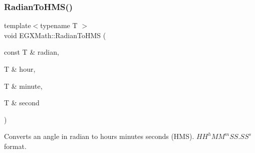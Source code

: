 \subsubsection{\texorpdfstring{Radian\+To\+H\+M\+S()}{RadianToHMS()}}
{\footnotesize\ttfamily template$<$typename T $>$ \\
void E\+G\+X\+Math\+::\+Radian\+To\+H\+MS (\begin{DoxyParamCaption}\item[{const T \&}]{radian,  }\item[{T \&}]{hour,  }\item[{T \&}]{minute,  }\item[{T \&}]{second }\end{DoxyParamCaption})}



Converts an angle in radian to hours minutes seconds (H\+MS). ${HH}^h{MM}^m{SS.SS}^s$ format. 



